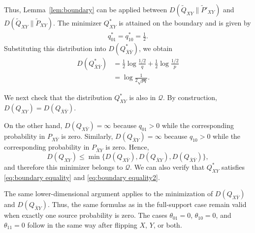 \documentclass[journal,onecolumn]{IEEEtran}
\theoremstyle{definition}
\theoremstyle{remark}
\newcommand{\Dxy}{D({Q_{XY}})}
\newcommand{\Dxby}{D({Q_{X\bar{Y}}})}
\newcommand{\Dbxy}{D({Q_{\bar{X}Y}})}
\newcommand{\Dbxby}{D({Q_{\bar{X}\bar{Y}}})}
\newcommand{\Qxy}{Q_{XY}}
\newcommand{\Qbxby}{Q_{\bar{X}\bar{Y}}}
\newcommand{\Pxby}{P_{X\bar{Y}}}
\newcommand{\Pbxy}{P_{\bar{X}Y}}
\newcommand{\Dbxbyas}{D(\Qbxby^*)}
\begin{document}
    Thus, Lemma~\ref{lem:boundary} can be applied between $D(\widetilde{Q}_{XY}\|\widetilde{P}'_{XY})$ and $D(\widetilde{Q}_{XY}\|\widetilde{P}_{XY})$.
    The minimizer $\Qxy^*$ is attained on the boundary and is given by
    \begin{align*}
        q_{01}^*=q_{10}^*=\frac{1}{2}.
    \end{align*}
    Substituting this distribution into $\Dbxbyas$, we obtain
    \begin{align*}
        \Dbxbyas
        &=
        \frac{1}{2}\log\frac{1/2}{q}
        +
        \frac{1}{2}\log\frac{1/2}{p}
        \\
        &=
        \log\frac{1}{2\sqrt{pq}}.
    \end{align*}

    We next check that the distribution $\Qxy^*$ is also in $\mathcal{Q}$.
    By construction, $\Dxy=\Dbxby$.

    On the other hand, $\Dxby=\infty$ because $q_{01}>0$ while the
    corresponding probability in $\Pxby$ is zero.  Similarly,
    $\Dbxy=\infty$ because $q_{10}>0$ while the corresponding
    probability in $\Pbxy$ is zero.  Hence,
    \[
        \Dxy
        \leq
        \min\{\Dxby,\Dbxy,\Dbxby\},
    \]
    and therefore this minimizer belongs to $\mathcal{Q}$.
    We can also verify that $Q_{XY}^*$ satisfies \eqref{eq:boundary equality} and \eqref{eq:boundary equality2}.

    The same lower-dimensional argument applies to the minimization of $\Dxby$ and $\Dbxy$.
    Thus, the same formulas as in the full-support case remain valid when exactly one source probability is zero. 
    The cases $\theta_{01}=0$, $\theta_{10}=0$, and $\theta_{11}=0$ follow in the same way after flipping $X$, $Y$, or both.
 
\end{document}

